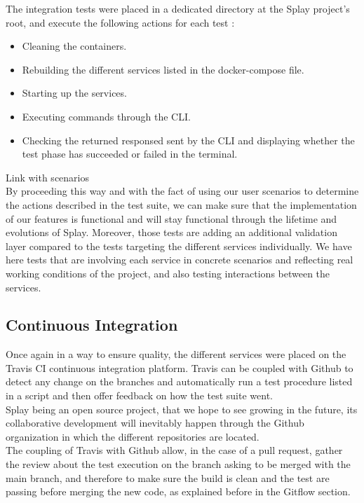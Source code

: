\documentclass{eplmastersthesis}
\begin{document}
        The integration tests were placed in a dedicated directory at the Splay
        project's root, and execute the following actions for each test :

        \begin{itemize}
          \item Cleaning the containers.
          \item Rebuilding the different services listed in the docker-compose
          file.
          \item Starting up the services.
          \item Executing commands through the CLI.
          \item Checking the returned responsed sent by the CLI and displaying
          whether the test phase has succeeded or failed in the terminal.
        \end{itemize}

        {\color{red} Link with scenarios}\\

        By proceeding this way and with the fact of using our user scenarios to
        determine the actions described in the test suite, we can make sure
        that the implementation of our features is functional and will stay
        functional through the lifetime and evolutions of Splay. Moreover, those
        tests are adding an additional validation layer compared to the tests
        targeting the different services individually. We have here tests that
        are involving each service in concrete scenarios and reflecting real
        working conditions of the project, and also testing interactions
        between the services.

      \subsection{Continuous Integration}

        Once again in a way to ensure quality, the different services were placed
        on the Travis CI \cite{travis} continuous integration platform. Travis
        can be coupled with Github to detect any change on the branches and
        automatically run a test procedure listed in a script and then offer
        feedback on how the test suite went.\\

        Splay being an open source project, that we hope to see growing in the
        future, its collaborative development will inevitably happen through
        the Github organization in which the different repositories are located.\\
        The coupling of Travis with Github allow, in the case of a pull request,
        gather the review about the test execution on the branch asking to be
        merged with the main branch, and therefore to make sure the build is
        clean and the test are passing before merging the new code, as
        explained before in the Gitflow section.
\end{document}
